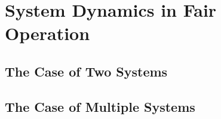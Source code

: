 \section{System Dynamics in Fair Operation}\label{sec:network:performance_model:analytical_model}



\subsection{The Case of Two Systems}\label{sec:network:performance_model:analytical_model:m_systems}

\subsection{The Case of Multiple Systems}\label{sec:network:performance_model:analytical_model:m_systems}
